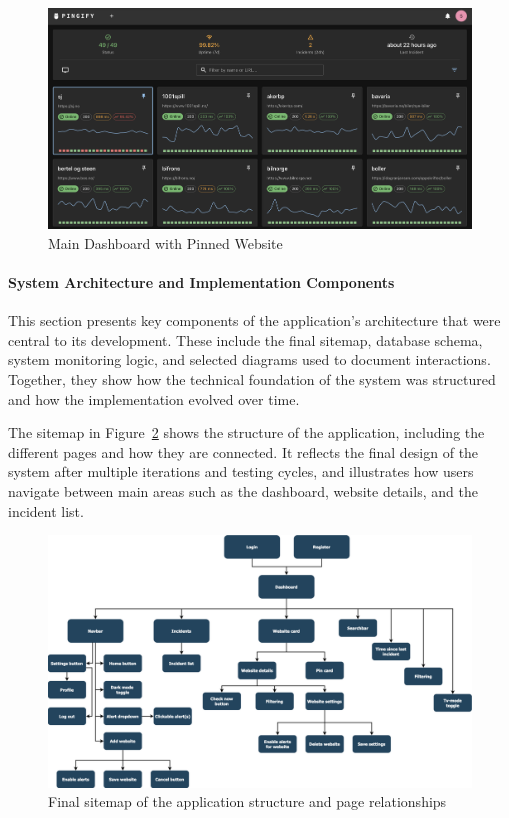 \begin{figure}[H]
    \centering
    \includegraphics[width=1\linewidth]{figures/main_dashboard.png}
    \caption{Main Dashboard with Pinned Website}
    \label{fig:main_dashboard}
\end{figure}


\paragraph{System Architecture and Implementation Components}

This section presents key components of the application’s architecture that were central to its development. These include the final sitemap, database schema, system monitoring logic, and selected diagrams used to document interactions. Together, they show how the technical foundation of the system was structured and how the implementation evolved over time.

The sitemap in Figure~\ref{fig:sitemap_final} shows the structure of the application, including the different pages and how they are connected. It reflects the final design of the system after multiple iterations and testing cycles, and illustrates how users navigate between main areas such as the dashboard, website details, and the incident list.

\begin{figure}[H]
\centering
\includegraphics[width=\textwidth]{figures/diagrams/sitemap-final.png}
\caption{Final sitemap of the application structure and page relationships}
\label{fig:sitemap_final}
\end{figure}

